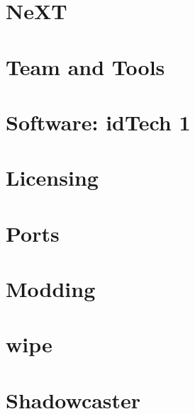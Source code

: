 \documentclass{book}
\begin{document}
     \chapter{NeXT}
          


    

    \chapter{Team and Tools}
          
      
      
      





    \chapter{Software: idTech 1}
      
      
      
      
      
      
      
      
      
      
      
      
      
      

    \chapter{Licensing}
      
      
      

    \chapter{Ports}        
          

    \chapter{Modding}
      

    \appendix
    \appendixpage
      \chapter{wipe}
      
      \chapter{Shadowcaster}  
      
\end{document}
